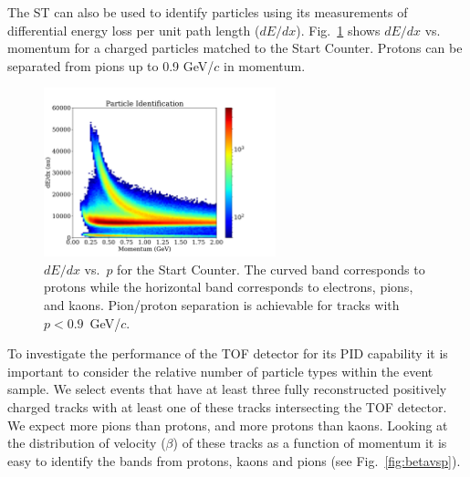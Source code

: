 The ST can also be used to identify particles using its measurements of differential energy loss per unit path length ($dE/dx$). Fig.~\ref{fig:ST_dEdx_vs_p} shows $dE/dx$ vs. momentum
for a charged particles matched to the Start Counter. Protons can be
separated from pions up to 0.9 GeV/$c$ in momentum.

\begin{figure}[!htb]
  \centering
  \includegraphics[width=0.6\textwidth]{figures/st_dedx_vs_p.pdf}
  \caption{$dE/dx$ vs.\ $p$ for the Start Counter.  The curved band
    corresponds to protons while the horizontal band corresponds to
    electrons, pions, and kaons. Pion/proton separation is achievable
    for tracks with $p < 0.9$~GeV/$c$.}\label{fig:ST_dEdx_vs_p}
\end{figure}

To investigate the performance of the TOF detector for its PID capability it is important to consider the relative number of
particle types within the event sample. We select events that have at least three fully reconstructed positively charged tracks with at least one of these tracks intersecting the TOF detector. We expect more pions than protons, and more protons than kaons. Looking at the distribution of velocity ($\beta$) of these tracks as a function of momentum it is easy to identify the bands from protons, kaons and pions (see Fig.~\ref{fig:betavsp}). 

